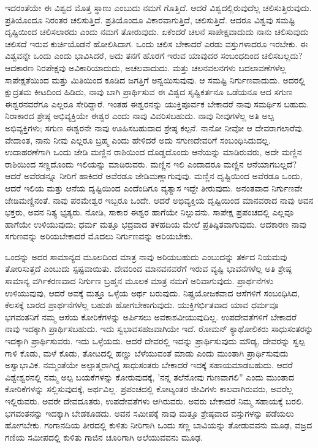 ಇದರಂತೆಯೇ ಈ ವಿಶ್ವದ ಮೊತ್ತ ಸ್ಥಾಣು ಎಂಬುದು ನಮಗೆ ಗೊತ್ತಿದೆ. ಆದರೆ ವಿಶ್ವದಲ್ಲಿರುವುದೆಲ್ಲ ಚಲಿಸುತ್ತಿರುವುದು. ಪ್ರತಿಯೊಂದೂ ನಿರಂತರ ಚಲಿಸುತ್ತಿದೆ. ಪ್ರತಿಯೊಂದೂ ವಿಕಾರವಾಗುತ್ತಿದೆ, ಚಲಿಸುತ್ತಿದೆ. ಆದರೂ ವಿಶ್ವವು ಸಮಷ್ಟಿ ದೃಷ್ಟಿಯಿಂದ ಚಲಿಸಲಾರದು ಎಂದು ನಮಗೆ ತೋರುವುದು. ಏಕೆಂದರೆ ಚಲನೆ ಸಾಪೇಕ್ಷವಾದುದು  ನಾನು ಚಲಿಸುವುದು ಚಲಿಸದೆ ಇರುವ ಕುರ್ಚಿಯೊಡನೆ ಹೋಲಿಸಿದಾಗ. ಒಂದು ಚಲಿಸ ಬೇಕಾದರೆ ಎರಡು ವಸ್ತುಗಳಾದರೂ ಇರಬೇಕು. ಈ ವಿಶ್ವವನ್ನೇ ಒಂದು ಎಂದು ಭಾವಿಸಿದರೆ, ಅದು ತನಗೆ ಹೊರಗೆ ಇರುವ ಯಾವುದರ ಸಂಬಂಧದಿಂದ ಚಲಿಸಬಲ್ಲದು? ಆದಕಾರಣ ನಿರಪೇಕ್ಷವು ಅವಿಕಾರಿಯಾದುದು, ಅಚಲವಾದುದು. ಮತ್ತು ಚಲನವಲನಗಳು ಬದಲಾವಣೆಗಳೆಲ್ಲ ಸಾಪೇಕ್ಷತೆಯಿಂದ ಮತ್ತು ಮಿತಿಯಿಂದ ಕೂಡಿದ ಜಗತ್ತಿಗೆ ಅನ್ವಯಿಸುವುವು. ಆ ಸಮಷ್ಟಿ ನಿರ್ಗುಣವಾದುದು. ಅದರಲ್ಲಿ ಕ್ಷುದ್ರತಮ ಕೀಟದಿಂದ ಹಿಡಿದು, ನಾವು ಬಾಗಿ ಪ್ರಾರ್ಥಿಸುವ ಈ ವಿಶ್ವದ ಸೃಷ್ಟಿಕರ್ತನೂ ಒಡೆಯನೂ ಆದ ಸಗುಣ ಈಶ್ವರನವರೆಗೂ ಎಲ್ಲರೂ ಸೇರಿದ್ದಾರೆ. ಇಂತಹ ಈಶ್ವರನನ್ನು ಯುಕ್ತಿಪೂರ್ವಕ ಬೇಕಾದರೆ ನಾವು ಸಮರ್ಥಿಸ ಬಹುದು. ನಿರಾಕಾರದ ಶ್ರೇಷ್ಠ ಅಭಿವ್ಯಕ್ತಿಯೇ ಈಶ್ವರ ಎಂದು ನಾವು ವಿವರಿಸಬಹುದು. ನಾವು ನೀವುಗಳೆಲ್ಲ ಅತಿ ಅಲ್ಪ ಅಭಿವ್ಯಕ್ತಿಗಳು; ಸಗುಣ ಈಶ್ವರನೇ ನಾವು ಊಹಿಸಬಹುದಾದ ಶ್ರೇಷ್ಠ ಕಲ್ಪನೆ. ನಾನೋ ನೀವೋ ಆ ದೇವರಾಗಲಾರೆವು. ವೇದಾಂತ, ನಾನು ನೀವು ಎಲ್ಲರೂ ಬ್ರಹ್ಮ ಎಂದು ಹೇಳಿದರೆ ಅದು ಸಗುಣದೇವರಿಗೆ ಸಂಬಂಧಿಸಿದುದಲ್ಲ. ಉದಾಹರಣೆಗಾಗಿ ಒಂದು ಜೇಡಿ ಮಣ್ಣಿನ ರಾಶಿಯಿಂದ ದೊಡ್ಡದೊಂದು ಆನೆಯನ್ನು ಮಾಡಿರುವರು, ಅದೇ ಮಣ್ಣಿನ ರಾಶಿಯಿಂದ ಸಣ್ಣದೊಂದು ಇಲಿಯನ್ನು ಮಾಡಿರುವರು. ಮಣ್ಣಿನ ಇಲಿ ಎಂದಾದರೂ ಮಣ್ಣಿನ ಆನೆಯಾಗಬಲ್ಲದೆ? ಆದರೆ ಅವೆರಡನ್ನೂ ನೀರಿಗೆ ಹಾಕಿದರೆ ಅವೆರಡೂ ಜೇಡಿಮಣ್ಣಾಗುವುವು. ಮಣ್ಣಿನ ದೃಷ್ಟಿಯಿಂದ ಅವೆರಡೂ ಒಂದು, ಆದರೆ ಇಲಿಯ ಮತ್ತು ಆನೆಯ ದೃಷ್ಟಿಯಿಂದ ಎಂದೆಂದಿಗೂ ವ್ಯತ್ಯಾಸ ಇದ್ದೇ ತೀರುವುದು. ಅನಂತವಾದ ನಿರ್ಗುಣವೇ ಜೇಡಿಮಣ್ಣಿನಂತೆ. ನಾವು ಪರಮೇಶ್ವರ ಇಬ್ಬರೂ ಒಂದೇ. ಆದರೆ ಅಭಿವ್ಯಕ್ತಿಯ ದೃಷ್ಟಿಯಿಂದ ಮಾನವರಾದ ನಾವು ಅವನ ಭಕ್ತರು, ಅವನ ನಿತ್ಯ ಭೃತ್ಯರು. ನೋಡಿ, ಸಾಕಾರ ಈಶ್ವರ ಹಾಗೆಯೇ ನಿಲ್ಲುವನು. ಸಾಪೇಕ್ಷ ಪ್ರಪಂಚದಲ್ಲಿ ಎಲ್ಲವೂ ಹಾಗೆಯೇ ಉಳಿಯುವುದು; ಧರ್ಮ ಮತ್ತೂ ಭದ್ರವಾದ ತಳಹದಿಯ ಮೇಲೆ ಪ್ರತಿಷ್ಠಿತವಾಗುವುದು. ಆದಕಾರಣ ನಾವು ಸಗುಣವನ್ನು ಅರಿಯಬೇಕಾದರೆ ಮೊದಲು ನಿರ್ಗುಣವನ್ನು ಅರಿಯಬೇಕು.

ಒಂದನ್ನು  ಅದರ ಸಾಮಾನ್ಯದ  ಮೂಲದಿಂದ ಮಾತ್ರ ನಾವು ಅರಿಯಬಹುದು ಎಂಬುದನ್ನು ತರ್ಕದ ನಿಯಮವು ತೋರಿಸುತ್ತದೆ ಎಂಬುದು ಸ್ಪಷ್ಟವಾಯಿತು. ದೇವರಿಂದ ಮಾನವನವರೆಗೆ ಇರುವ ವ್ಯಷ್ಟಿ ಭಾವನೆಗಳೆಲ್ಲ ಅತಿ ಶ್ರೇಷ್ಠ ಸಾಮಾನ್ಯ ವರ್ಗಿಕರಣವಾದ ನಿರ್ಗುಣ ಬ್ರಹ್ಮನ ಮೂಲಕ ಮಾತ್ರ ನಮಗೆ ಅರಿವಾಗುವುದು. ಪ್ರಾರ್ಥನೆಗಳು ಉಳಿಯುವುವು, ಆದರೆ ಅವಕ್ಕೆ ಮತ್ತೂ ಒಳ್ಳೆಯ ಅರ್ಥ ಬರುವುದು. ನಿಷ್ಪ್ರಯೋಜಕವಾದ ಆಸೆಗಳಿಗೆ ಸಂಬಂಧಿಸಿದ, ಕೆಲಸಕ್ಕೆ ಬಾರದ ಪ್ರಾರ್ಥನೆಗಳೆಲ್ಲ ಬಹುಶಃ ಹೋಗಬೇಕಾಗುವುದು. ಯುಕ್ತಿಗರ್ಭಿತವಾದ ಯಾವ ಧರ್ಮವೂ ಭಗವಂತನಿಗೆ ನಮ್ಮ ಆಸೆಯ ಕೋರಿಕೆಗಳನ್ನು ಅರ್ಪಿಸಲು ಅವಕಾಶವೀಯುವುದಿಲ್ಲ. ಉಪದೇವತೆಗಳಿಗೆ ಬೇಕಾದರೆ ನಾವು ಇದಕ್ಕಾಗಿ ಪ್ರಾರ್ಥಿಸಬಹುದು. ಇದು ಸ್ವಭಾವಸಹಜವಾಗಿಯೇ ಇದೆ. ರೋಮನ್ ಕ್ಯಾಥೋಲಿಕರು ಸಾಧುಸಂತರನ್ನು ಇದಕ್ಕಾಗಿ ಪ್ರಾರ್ಥಿಸುವರು. ಇದು ಒಳ್ಳೆಯದು. ಆದರೆ ದೇವರಲ್ಲಿ ಇದನ್ನು ಪ್ರಾರ್ಥಿಸುವುದು ಮೌಡ್ಯ, ದೇವರನ್ನು ಸ್ವಲ್ಪ ಗಾಳಿ ಕೊಡು, ಮಳೆ ಕೊಡು, ತೋಟದಲ್ಲಿ ಹಣ್ಣು ಬೆಳೆಯುವಂತೆ ಮಾಡು ಎಂದು ಮುಂತಾಗಿ ಪ್ರಾರ್ಥಿಸುವುದು ಅಸ್ವಾಭಾವಿಕ. ನಮ್ಮಂತೆಯೇ ಅಲ್ಪಾತ್ಮರಾಗಿದ್ದ ಸಾಧುಸಂತರು ಬೇಕಾದರೆ ಇದಕ್ಕೆ ಸಹಾಯಮಾಡಬಹುದು. ಆದರೆ ವಿಶ್ವೇಶ್ವರನಲ್ಲಿ ನಮ್ಮ ಅಲ್ಪ ಬಯಕೆಗಳನ್ನು ಕೋರುವುದಕ್ಕೆ, 'ನನ್ನ ತಲೆನೋವು ಗುಣವಾಗಲಿ'' ಎಂದು ಮುಂತಾದ ಕೋರಿಕೆಗಳನ್ನು ಸಲ್ಲಿಸುವುದಕ್ಕೆ, ಅರ್ಥವಿಲ್ಲ. ಪ್ರಪಂಚದಲ್ಲಿ ಕೋಟ್ಯಂತರ ಜೀವಿಗಳು ಕಾಲವಾಗಿರುವರು, ಅವರೆಲ್ಲ ಇಲ್ಲಿರುವರು. ಅವರೇ ದೇವದೂತರು, ಉಪದೇವತೆಗಳು ಆಗಿರುವರು. ಅವರು ಬೇಕಾದರೆ ನಿಮ್ಮ ಸಹಾಯಕ್ಕೆ ಬರಲಿ. ಭಗವಂತನನ್ನು ಇದಕ್ಕಾಗಿ ಬೇಡಕೂಡದು. ಅವನ ಸಮೀಪಕ್ಕೆ ನಾವು ಮತ್ತೂ ಶ್ರೇಷ್ಠವಾದ ವಸ್ತುಗಳನ್ನು ಪಡೆಯಲು ಹೋಗಬೇಕು. ಗಂಗಾನದಿಯ ತೀರದಲ್ಲಿ ಕುಳಿತು ನೀರಿಗಾಗಿ ಒಂದು ಸಣ್ಣ ಬಾವಿಯನ್ನು ತೋಡುವವನು ಮೂಢ, ವಜ್ರದ ಗಣಿಯ ಸಮೀಪದಲ್ಲಿ ಕುಳಿತು ಗಾಜಿನ ಚೂರಿಗಾಗಿ ಅಲೆಯುವವನು ಮೂಢ.

